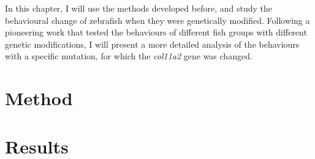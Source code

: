 \documentclass[11pt,twoside]{report}
\begin{document}
In this chapter, I will use the methods developed before, and study the behavioural change of zebrafish when they were genetically modified. Following a pioneering work \cite{tang2020} that tested the behaviours of different fish groups with different genetic modifications, I will present a more detailed analysis of the behaviours with a specific mutation, for which the \emph{col11a2} gene was changed.

\section{Method}

\section{Results}

\printbibliography
\end{document}
